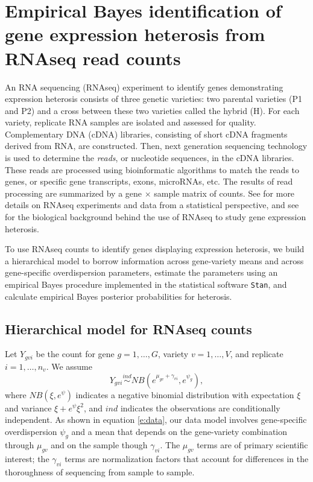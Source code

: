 \documentclass[useAMS,usenatbib,referee]{biom}
\newcommand{\RNAseq}{RNAseq}
\begin{document}
\section{Empirical Bayes identification of gene expression heterosis from \RNAseq{} read counts}
\label{s:method}

An RNA sequencing (\RNAseq{}) experiment to identify genes demonstrating expression heterosis consists of three genetic varieties: two parental varieties (P1 and P2) and a cross between these two varieties called the hybrid (H). For each variety, replicate RNA samples are isolated and assessed for quality. Complementary DNA (cDNA) libraries, consisting of short cDNA fragments derived from RNA, are constructed. Then, next generation sequencing technology is used to determine the \emph{reads}, or nucleotide sequences, in the cDNA libraries. These reads are processed using bioinformatic algorithms to match the reads to genes, or specific gene transcripts, exons, microRNAs, etc. The results of read processing are summarized by a gene $\times$ sample matrix of counts. See \cite{datta2014statistical} for more details on \RNAseq{} experiments and data from a statistical perspective, and see \cite{paschold2012complementation} for the biological background behind the use of \RNAseq{} to study gene expression heterosis.

To use \RNAseq{} counts to identify genes displaying expression heterosis, we build a hierarchical model to borrow information across gene-variety means and across gene-specific overdispersion parameters, estimate the parameters using an empirical Bayes procedure implemented in the statistical software {\tt Stan}, and calculate empirical Bayes posterior probabilities for heterosis. 


\subsection{Hierarchical model for \RNAseq{} counts}
\label{s:model}

Let $Y_{gvi}$ be the count for gene $g=1,\ldots,G$, variety $v=1,\ldots,V$, and replicate $i=1,\ldots,n_v$.  We assume
\begin{equation} 
Y_{gvi} \stackrel{ind}{\sim} NB\left(e^{\mu_{gv}+\gamma_{vi}},e^{\psi_g}\right), 
\label{e:data}
\end{equation}
where $NB(\xi,e^\psi)$ indicates a negative binomial distribution with expectation $\xi$ and variance $\xi+e^\psi\xi^2$, and $ind$ indicates the observations are conditionally independent.  As shown in equation \eqref{e:data}, our data model involves gene-specific overdispersion $\psi_g$ and a mean that depends on the gene-variety combination through $\mu_{gv}$ and on the sample though  $\gamma_{vi}$.  The $\mu_{gv}$ terms are of primary scientific interest; the $\gamma_{vi}$ terms are normalization factors that account for differences in the thoroughness of sequencing from sample to sample. 
\end{document}
